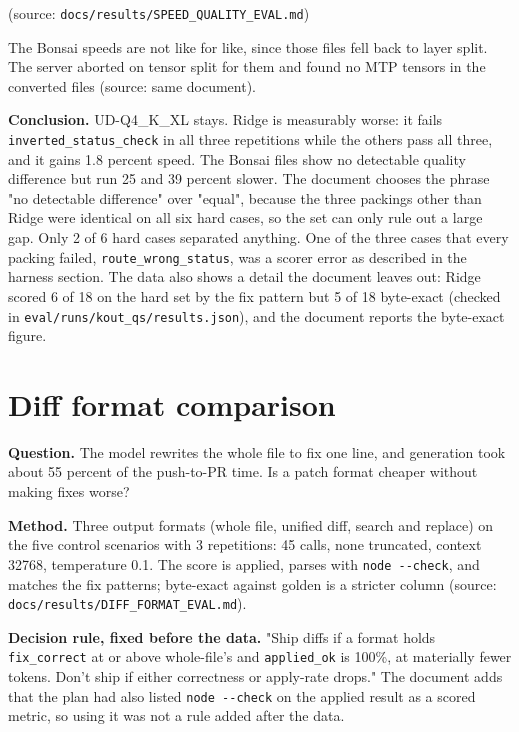 (source: \texttt{docs/\allowbreak{}results/\allowbreak{}SPEED\_\allowbreak{}QUALITY\_\allowbreak{}EVAL.\allowbreak{}md})

The Bonsai speeds are not like for like, since those files fell back to layer split. The server aborted on tensor split for them and found no MTP tensors in the converted files (source: same document).

\textbf{Conclusion.} UD-Q4\_\allowbreak{}K\_\allowbreak{}XL stays. Ridge is measurably worse: it fails \texttt{inverted\_\allowbreak{}status\_\allowbreak{}check} in all three repetitions while the others pass all three, and it gains 1.8 percent speed. The Bonsai files show no detectable quality difference but run 25 and 39 percent slower. The document chooses the phrase "no detectable difference" over "equal", because the three packings other than Ridge were identical on all six hard cases, so the set can only rule out a large gap. Only 2 of 6 hard cases separated anything. One of the three cases that every packing failed, \texttt{route\_\allowbreak{}wrong\_\allowbreak{}status}, was a scorer error as described in the harness section. The data also shows a detail the document leaves out: Ridge scored 6 of 18 on the hard set by the fix pattern but 5 of 18 byte-exact (checked in \texttt{eval/\allowbreak{}runs/\allowbreak{}kout\_\allowbreak{}qs/\allowbreak{}results.\allowbreak{}json}), and the document reports the byte-exact figure.

\section{Diff format comparison}

\textbf{Question.} The model rewrites the whole file to fix one line, and generation took about 55 percent of the push-to-PR time. Is a patch format cheaper without making fixes worse?

\textbf{Method.} Three output formats (whole file, unified diff, search and replace) on the five control scenarios with 3 repetitions: 45 calls, none truncated, context 32768, temperature 0.1. The score is applied, parses with \texttt{node -\allowbreak{}-\allowbreak{}check}, and matches the fix patterns; byte-exact against golden is a stricter column (source: \texttt{docs/\allowbreak{}results/\allowbreak{}DIFF\_\allowbreak{}FORMAT\_\allowbreak{}EVAL.\allowbreak{}md}).

\textbf{Decision rule, fixed before the data.} "Ship diffs if a format holds \texttt{fix\_\allowbreak{}correct} at or above whole-file's and \texttt{applied\_\allowbreak{}ok} is 100\%, at materially fewer tokens. Don't ship if either correctness or apply-rate drops." The document adds that the plan had also listed \texttt{node -\allowbreak{}-\allowbreak{}check} on the applied result as a scored metric, so using it was not a rule added after the data.

